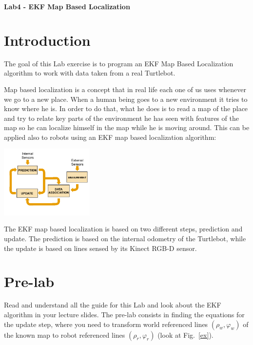 \documentclass[a4paper,10pt]{article}
\begin{document}
\marginsize{2cm}{2cm}{2cm}{2cm}

\begin{center}
\Large \textbf{Lab4 - EKF Map Based Localization}
\end{center}

\section{Introduction}

The goal of this Lab exercise is to program an EKF Map Based Localization algorithm to work with data taken from a real Turtlebot.

Map based localization is a concept that in real life each one of us uses whenever we go to a new place. When a human being goes to a new environment it tries to know where he is. In order to do that, what he does is to read a map of the place and try to relate key parts of the environment he has seen with features of the map so he can localize himself in the map while he is moving around. This can be applied also to robots using an EKF map based localization algorithm:

\begin{center}
	\includegraphics[width=0.35\textwidth]{pict/ekf_pic.png}
	\label{measur}
\end{center}

The EKF map based localization is based on two different steps, prediction and update. The prediction is based on the internal odometry of the Turtlebot, while the update is based on lines sensed by its Kinect RGB-D sensor.

\section{Pre-lab}

Read and understand all the guide for this Lab and look about the EKF algorithm in your lecture slides. The pre-lab consists in finding the equations for the update step, where you need to transform world referenced lines $(\rho_w, \varphi_w)$ of the known map to robot referenced lines $(\rho_r, \varphi_r)$ (look at Fig.~\ref{ex}).
\end{document}
